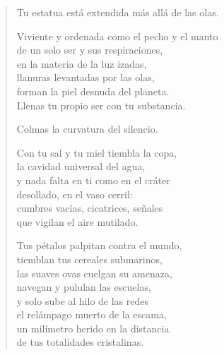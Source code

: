 \documentclass[12pt]{article}
\begin{document}
\begin{verse}
Tu estatua está extendida más allá de las olas.  

Viviente y ordenada como el pecho y el manto\\
de un solo ser y sus respiraciones,\\
en la materia de la luz izadas,\\
llanuras levantadas por las olas,\\
forman la piel desnuda del planeta.\\
Llenas tu propio ser con tu substancia.  

Colmas la curvatura del silencio.  

Con tu sal y tu miel tiembla la copa,\\
la cavidad universal del agua,\\
y nada falta en ti como en el cráter\\
desollado, en el vaso cerril:\\
cumbres vacías, cicatrices, señales\\
que vigilan el aire mutilado.  

Tus pétalos palpitan contra el mundo,\\
tiemblan tus cereales submarinos,\\
las suaves ovas cuelgan su amenaza,\\
navegan y pululan las escuelas,\\
y solo sube al hilo de las redes\\
el relámpago muerto de la escama,\\
un milímetro herido en la distancia\\
de tus totalidades cristalinas.  

\end{verse}
\end{document}
